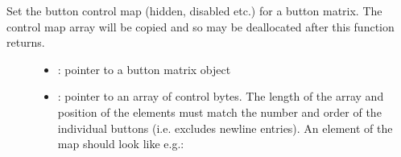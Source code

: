 \documentclass[letterpaper,10pt,english]{sphinxmanual}
\begin{document}
\begin{fulllineitems}
\label{\detokenize{object-types/btnm:_CPPv420lv_btnm_set_ctrl_mapPK8lv_obj_tA_K14lv_btnm_ctrl_t}}%
\pysigstartmultiline
{}\label{\detokenize{object-types/btnm:lv__btnm_8h_1ab23a2e9c00d4e30922674915b6911961}}%
\pysigstopmultiline
Set the button control map (hidden, disabled etc.) for a button matrix. The control map array will be copied and so may be deallocated after this function returns. \begin{description}
\item[{}] \leavevmode\begin{itemize}
\item {} 
: pointer to a button matrix object 

\item {} 
: pointer to an array of  control bytes. The length of the array and position of the elements must match the number and order of the individual buttons (i.e. excludes newline entries). An element of the map should look like e.g.:  

\end{itemize}

\end{description}


\end{fulllineitems}

\end{document}
